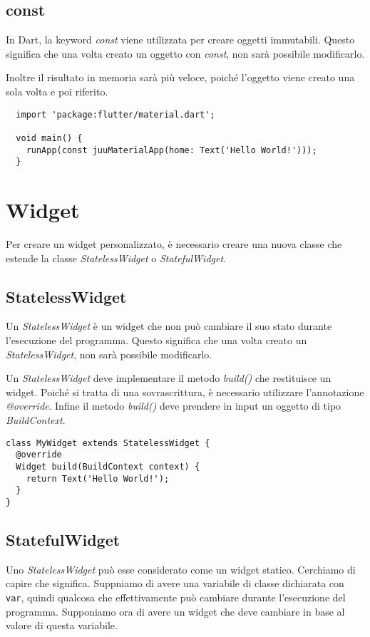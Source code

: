 \documentclass[12pt]{article}
\begin{document}
\subsection{const}
In Dart, la keyword \textit{const} viene utilizzata per creare
oggetti immutabili. Questo significa che una volta creato un oggetto con \textit{const}, non sarà possibile modificarlo.

Inoltre il risultato in memoria sarà più veloce, poiché l'oggetto
viene creato una sola volta e poi riferito.

\begin{verbatim}
  import 'package:flutter/material.dart';
  
  void main() {
    runApp(const juuMaterialApp(home: Text('Hello World!')));
  }
\end{verbatim}

\section{Widget}
Per creare un widget personalizzato, è necessario creare una nuova classe
che estende la classe \textit{StatelessWidget} o \textit{StatefulWidget}.

\subsection{StatelessWidget}
Un \textit{StatelessWidget} è un widget che non può cambiare il suo stato
durante l'esecuzione del programma. Questo significa che una volta creato
un \textit{StatelessWidget}, non sarà possibile modificarlo.

Un \textit{StatelessWidget} deve implementare il metodo \textit{build()} che
restituisce un widget. Poiché si tratta di 
una sovrascrittura, è necessario utilizzare l'annotazione \textit{@override}. Infine 
il metodo \textit{build()} deve prendere in input un oggetto di tipo \textit{BuildContext}.
\begin{verbatim}
class MyWidget extends StatelessWidget {
  @override
  Widget build(BuildContext context) {
    return Text('Hello World!');
  }
}
\end{verbatim}



\subsection{StatefulWidget}
Uno \textit{StatelessWidget} può esse considerato come un widget statico. Cerchiamo di capire che significa.
Suppniamo di avere una variabile di classe dichiarata con \texttt{var}, quindi qualcosa che effettivamente può cambiare durante l'esecuzione del programma. 
Supponiamo ora di avere un widget che deve cambiare in base al valore di questa variabile. 
\end{document}
